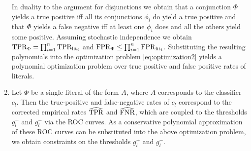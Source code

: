 \begin{enumerate}
  In duality to the argument for disjunctions we obtain that a conjunction $\Phi$ yields a true positive iff all its conjunctions $\phi_i$ do yield a true positive and that $\Phi$ yields a false negative iff at least one $\phi_i$ does and all the others yield some positive. Assuming stochastic independence %
  we obtain 
  $\mathrm{TPR}_\Phi = \prod_{i=1}^n \mathrm{TPR}_{\mathrm{lit}_i}$ and
  $\mathrm{FPR}_\Phi \leq \prod_{i=1}^n \mathrm{FPR}_{\mathrm{lit}_i}$.
  Substituting the resulting polynomials into the optimization problem \eqref{eq:optimization2} yields a polynomial optimization problem over true positive and false positive rates of literals.
\item Let $\Phi$ be a single literal of the form $A$,
  where $A$ corresponds to the classifier $c_l$. Then the true-positive and false-negative rates of $c_l$ correspond to the corrected empirical rates $\widehat{\mathrm{TPR}}$ and $\widehat{\mathrm{FNR}}$, which are coupled to the thresholds $g_l^+$ and $g_l^-$ via the ROC curves. As a conservative polynomial approximation of these ROC curves can be substituted into the above optimization problem, we obtain constraints on the thresholds $g_l^+$ and $g_l^-$. 

\end{enumerate}
